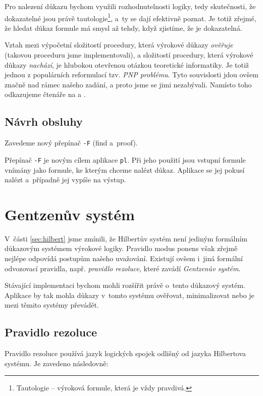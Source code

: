 \documentclass[thesis=B,czech,hidelinks]{thesis}[2012/06/26]
\begin{document}
Pro nalezení důkazu bychom využili rozhodnutelnosti logiky, tedy skutečnosti, že dokazatelné jsou právě tautologie\footnote{Tautologie -- výroková formule, která je vždy pravdivá.}, a~ty se dají efektivně poznat. Je totiž zřejmé, že hledat důkaz formule má smysl až tehdy, když zjistíme, že je dokazatelná.

Vztah mezi výpočetní složitostí procedury, která výrokové důkazy \emph{ověřuje} (takovou proceduru jsme implementovali), a složitostí procedury, která výrokové důkazy \emph{nachází}, je hlubokou otevřenou otázkou teoretické informatiky. Je totiž jednou z populárních reformulací tzv. \emph{PNP problému}. Tyto souvislosti jdou ovšem značně nad rámec našeho zadání, a proto jsme se jimi nezabývali. Namísto toho odkazujeme čtenáře na \cite{krajicek} a \cite{cook}.

\subsection{Návrh obsluhy}

Zavedeme nový přepínač \texttt{-F} (find a~proof).

Přepínač \texttt{-F} je novým cílem aplikace \texttt{pl}. Při jeho použití jsou vstupní formule vnímány jako formule, ke kterým chceme nalézt důkaz. Aplikace se jej pokusí nalézt a~případně jej vypíše na výstup.

\section{Gentzenův systém}
\label{sec:gentzen}

V~části \ref{sec:hilbert} jsme zmínili, že Hilbertův systém není jediným formálním důkazovým systémem výrokové logiky. Pravidlo modus ponens však zřejmě nejlépe odpovídá postupům našeho uvažování\cite{sochor}. Existují ovšem i~jiná formální odvozovací pravidla, např. \emph{pravidlo rezoluce}, které zavádí \emph{Gentzenův systém}.

Stávající implementaci bychom mohli rozšířit právě o~tento důkazový systém. Aplikace by tak mohla důkazy v~tomto systému ověřovat, minimalizovat nebo je mezi těmito systémy převádět.

\subsection{Pravidlo rezoluce}

Pravidlo rezoluce používá jazyk logických spojek odlišný od jazyka Hilbertova systému. Je zavedeno následovně\cite{stary}:
\end{document}
